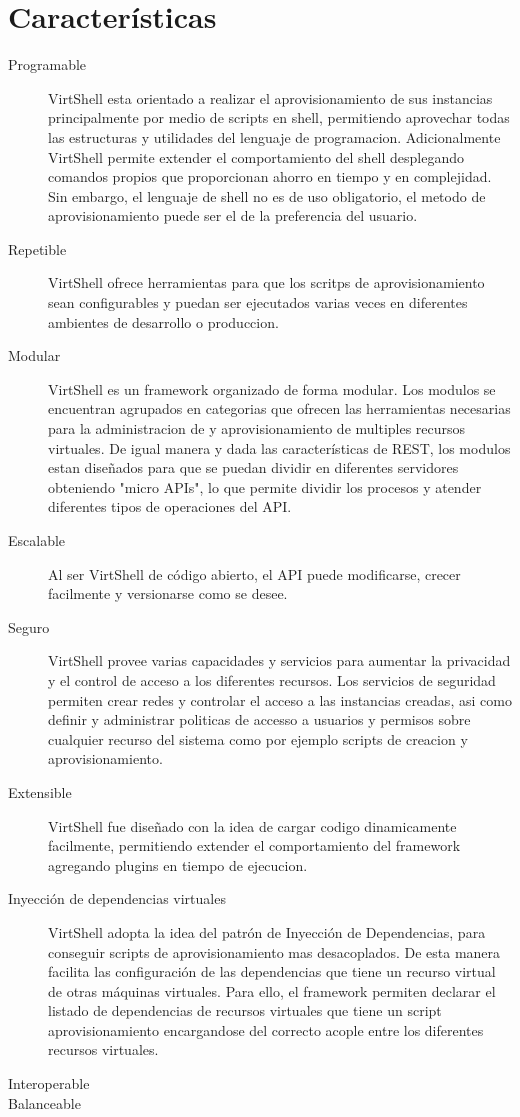 

\section{Características}

\begin{description}
\item [Programable] VirtShell esta orientado a realizar el aprovisionamiento de sus instancias principalmente por medio de scripts en shell, permitiendo aprovechar todas las estructuras y utilidades del lenguaje de programacion. Adicionalmente VirtShell permite extender el comportamiento del shell desplegando comandos propios que proporcionan ahorro en tiempo y en complejidad. Sin embargo, el lenguaje de shell no es de uso obligatorio, el  metodo de aprovisionamiento puede ser el de la preferencia del usuario. 
\item [Repetible] VirtShell ofrece herramientas para que los scritps de aprovisionamiento sean configurables y  puedan ser ejecutados varias veces en diferentes ambientes de desarrollo o produccion.
\item [Modular] VirtShell es un framework organizado de forma modular. Los modulos se encuentran agrupados en categorias que ofrecen las herramientas necesarias para la administracion de y aprovisionamiento de multiples recursos virtuales. De igual manera y dada las características de REST, los modulos estan diseñados para que se puedan dividir en diferentes servidores obteniendo "micro APIs", lo que permite dividir los procesos y atender diferentes tipos de operaciones del API. 
\item [Escalable] Al ser VirtShell de código abierto, el API puede modificarse, crecer facilmente y versionarse como se desee. 
\item [Seguro] VirtShell provee varias capacidades y servicios para aumentar la privacidad y el control de acceso a los diferentes recursos. Los servicios de seguridad permiten crear redes y controlar el acceso a las instancias creadas, asi como definir y administrar politicas de accesso a usuarios y permisos sobre cualquier recurso del sistema como por ejemplo scripts de creacion y aprovisionamiento.
\item [Extensible] VirtShell fue diseñado con la idea de cargar codigo dinamicamente facilmente, permitiendo extender el comportamiento del framework agregando plugins en tiempo de ejecucion.
\item [Inyección de dependencias virtuales] VirtShell adopta la idea del patrón de Inyección de Dependencias, para conseguir scripts de aprovisionamiento mas desacoplados. De esta manera facilita las configuración de las dependencias que tiene un recurso virtual de otras máquinas virtuales. Para ello, el framework permiten declarar el listado de dependencias de recursos virtuales que tiene un script aprovisionamiento encargandose del correcto acople entre los diferentes recursos virtuales.
\item [Interoperable] 
\item [Balanceable]
\end{description}

